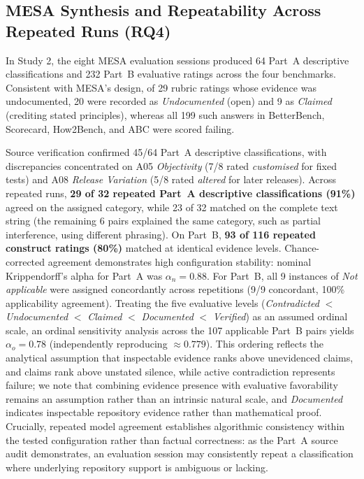 \documentclass[runningheads]{llncs}
\begin{document}
\subsection{MESA Synthesis and Repeatability Across Repeated Runs (RQ4)}
In Study 2, the eight MESA evaluation sessions produced 64 Part~A descriptive classifications and 232 Part~B evaluative ratings across the four benchmarks. Consistent with MESA's design, of 29 rubric ratings whose evidence was undocumented, 20 were recorded as \emph{Undocumented} (open) and 9 as \emph{Claimed} (crediting stated principles), whereas all 199 such answers in BetterBench, Scorecard, How2Bench, and ABC were scored failing. 

Source verification confirmed 45/64 Part~A descriptive classifications, with discrepancies concentrated on A05 \emph{Objectivity} (7/8 rated \emph{customised} for fixed tests) and A08 \emph{Release Variation} (5/8 rated \emph{altered} for later releases). Across repeated runs, \textbf{29 of 32 repeated Part~A descriptive classifications (91\%)} agreed on the assigned category, while 23 of 32 matched on the complete text string (the remaining 6 pairs explained the same category, such as partial interference, using different phrasing). On Part~B, \textbf{93 of 116 repeated construct ratings (80\%)} matched at identical evidence levels. Chance-corrected agreement demonstrates high configuration stability: nominal Krippendorff's alpha for Part~A was $\alpha_n = 0.88$. For Part~B, all 9 instances of \emph{Not applicable} were assigned concordantly across repetitions (9/9 concordant, 100\% applicability agreement). Treating the five evaluative levels (\emph{Contradicted} $<$ \emph{Undocumented} $<$ \emph{Claimed} $<$ \emph{Documented} $<$ \emph{Verified}) as an assumed ordinal scale, an ordinal sensitivity analysis across the 107 applicable Part~B pairs yields $\alpha_o = 0.78$ (independently reproducing $\approx 0.779$). This ordering reflects the analytical assumption that inspectable evidence ranks above unevidenced claims, and claims rank above unstated silence, while active contradiction represents failure; we note that combining evidence presence with evaluative favorability remains an assumption rather than an intrinsic natural scale, and \emph{Documented} indicates inspectable repository evidence rather than mathematical proof. Crucially, repeated model agreement establishes algorithmic consistency within the tested configuration rather than factual correctness: as the Part~A source audit demonstrates, an evaluation session may consistently repeat a classification where underlying repository support is ambiguous or lacking.
\end{document}
